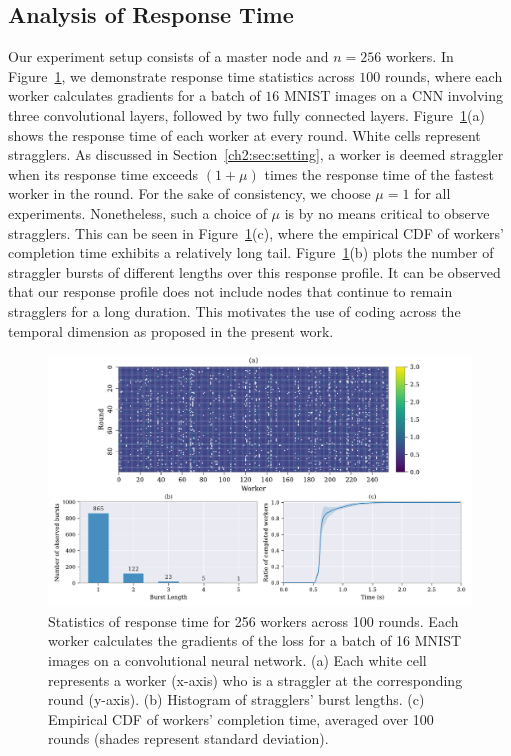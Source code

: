 \subsection{Analysis of Response Time} \label{ch2:subsec:response-time}

Our experiment setup consists of a master node and $n=256$ workers. In Figure~\ref{ch2:fig:4-1}, we demonstrate response time statistics across $100$ rounds, where each worker calculates gradients for a batch of $16$ MNIST images on a CNN involving three convolutional layers, followed by two fully connected layers.  Figure~\ref{ch2:fig:4-1}(a) shows the response time of each worker at every round. White cells represent stragglers. As discussed in Section~\ref{ch2:sec:setting}, a worker is deemed straggler when its response time exceeds $(1+\mu)$ times the response time of the fastest worker in the round. For the sake of consistency, we choose $\mu=1$ for all experiments. Nonetheless, such a choice of $\mu$ is by no means critical to observe stragglers. This can be seen in Figure~\ref{ch2:fig:4-1}(c), where the empirical CDF of workers' completion time exhibits a relatively long tail. Figure~\ref{ch2:fig:4-1}(b) plots the number of straggler bursts of different lengths over this response profile. It can be observed that our response profile does not include nodes that continue to remain stragglers for a long duration. This motivates the use of coding across the temporal dimension as proposed in the present work.

\begin{figure}[h]
    \centering
    \includegraphics[width=\textwidth]{figs/ch2/fig1.pdf}
    \caption{Statistics of response time for 256 workers across 100 rounds. Each worker calculates the gradients of the loss for a batch of 16 MNIST images on a convolutional neural network. (a) Each white cell represents a worker (x-axis) who is a straggler at the corresponding round (y-axis). (b) Histogram of stragglers' burst lengths. (c) Empirical CDF of workers' completion time, averaged over 100 rounds (shades represent standard deviation).}
    \label{ch2:fig:4-1}
\end{figure}


